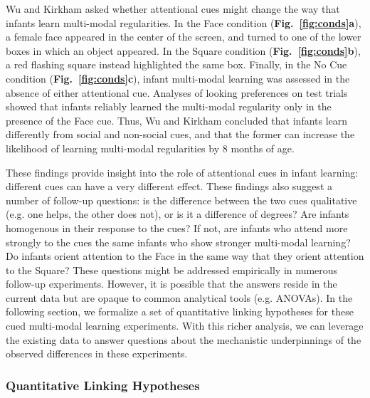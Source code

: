 \documentclass[12pt]{article}
\begin{document}
	Wu and Kirkham \cite{Wu2010a} asked whether attentional cues might change the way that infants learn multi-modal regularities. In the Face condition (\textbf{Fig.~\ref{fig:conds}a}), a female face appeared in the center of the screen, and turned to one of the lower boxes in which an object appeared. In the Square condition (\textbf{Fig.~\ref{fig:conds}b}), a red flashing square instead highlighted the same box. Finally, in the No Cue condition (\textbf{Fig.~\ref{fig:conds}c}), infant multi-modal learning was assessed in the absence of either attentional cue. Analyses of looking preferences on test trials showed that infants reliably learned the multi-modal regularity only in the presence of the Face cue. Thus, Wu and Kirkham \cite{Wu2010a} concluded that infants learn differently from social and non-social cues, and that the former can increase the likelihood of learning multi-modal regularities by 8 months of age.
	
	These findings provide insight into the role of attentional cues in infant learning: different cues can have a very different effect. These findings also suggest a number of follow-up questions: is the difference between the two cues qualitative (e.g. one helps, the other does not), or is it a difference of degrees? Are infants homogenous in their response to the cues? If not, are infants who attend more strongly to the cues the same infants who show stronger multi-modal learning? Do infants orient attention to the Face in the same way that they orient attention to the Square? These questions might be addressed empirically in numerous follow-up experiments. However, it is possible that the answers reside in the current data but are opaque to common analytical tools (e.g. ANOVAs). In the following section, we formalize a set of quantitative linking hypotheses for these cued multi-modal learning experiments. With this richer analysis, we can leverage the existing data to answer questions about the mechanistic underpinnings of the observed differences in these experiments.

\subsubsection*{Quantitative Linking Hypotheses}
\end{document}
